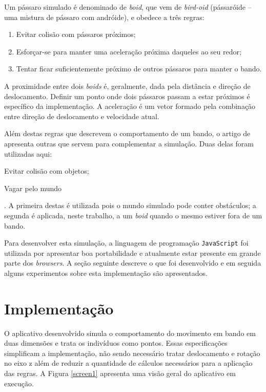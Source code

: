 \documentclass[12pt]{article}
\begin{document}
Um pássaro simulado é denominado de \textit{boid}, que vem de
\textit{bird-oid} (pássaróide -- uma mistura de pássaro com andróide),
e obedece a três regras:

\begin{enumerate}
\item Evitar colisão com pássaros próximos;

\item Esforçar-se para manter uma aceleração próxima daqueles
  ao seu redor;

\item Tentar ficar suficientemente próximo de outros pássaros para manter
  o bando.
\end{enumerate}

A proximidade entre dois \textit{boids} é, geralmente, dada pela
distância e direção de deslocamento. Definir um ponto onde dois
pássaros passam a estar próximos é específico da implementação. A
aceleração é um vetor formado pela combinação entre direção de
deslocamento e velocidade atual.

Além destas regras que descrevem o comportamento de um bando, o artigo
de \cite{reynolds2} apresenta outras que servem para complementar a
simulação. Duas delas foram utilizadas
aqui: \begin{inparaenum}[(1)] \item Evitar colisão com objetos; \item
  Vagar pelo mundo\end{inparaenum}. A primeira destas é utilizada pois
o mundo simulado pode conter obstáculos; a segunda é aplicada, neste
trabalho, a um \textit{boid} quando o mesmo estiver fora de um bando.

Para desenvolver esta simulação, a linguagem de programação
\texttt{JavaScript} \cite{jsref} foi utilizada por apresentar boa
portabilidade e atualmente estar presente em grande parte dos
\textit{browsers}. A seção seguinte descreve o que foi desenvolvido e
em seguida alguns experimentos sobre esta implementação são
apresentados.


\section{Implementação}

O aplicativo desenvolvido simula o comportamento do movimento em bando
em duas dimensões e trata os indivíduos como pontos. Essas
especificações simplificam a implementação, não sendo necessário
tratar deslocamento e rotação no eixo z além de reduzir a quantidade de
cálculos necessários para a aplicação das regras. A Figura
\ref{screen1} apresenta uma visão geral do aplicativo em execução.
\end{document}
